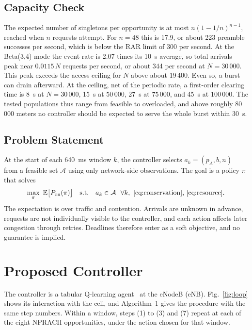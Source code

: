 \documentclass[conference]{IEEEtran}
\begin{document}
\subsection{Capacity Check}
The expected number of singletons per opportunity is at most $n(1-1/n)^{n-1}$, reached
when $n$ requests attempt. For $n = 48$ this is 17.9, or about 223 preamble successes
per second, which is below the RAR limit of 300 per second. At the Beta(3,4) mode the
event rate is 2.07 times its 10~s average, so total arrivals peak near $0.0115\,N$
requests per second, or about 344 per second at $N = 30\,000$. This peak exceeds the
access ceiling for $N$ above about 19\,400. Even so, a burst can drain afterward. At
the ceiling, net of the periodic rate, a first-order clearing time is 8~s at
$N = 30\,000$, 15~s at $50\,000$, 27~s at $75\,000$, and 45~s at $100\,000$. The tested
populations thus range from feasible to overloaded, and above roughly 80\,000 meters
no controller should be expected to serve the whole burst within 30~s.

\subsection{Problem Statement}
At the start of each 640~ms window $k$, the controller selects
$a_k = (p_A, b, n)$ from a feasible set $\mathcal{A}$ using only network-side
observations. The goal is a policy $\pi$ that solves
\begin{equation}
\max_{\pi}\ \mathbb{E}\big[P_{\mathrm{on}}(\pi)\big]
\quad \text{s.t.} \quad a_k \in \mathcal{A}\ \ \forall k,
\ \text{\eqref{eq:conservation}, \eqref{eq:resource}.}
\label{eq:problem}
\end{equation}
The expectation is over traffic and contention. Arrivals are unknown in advance,
requests are not individually visible to the controller, and each action affects
later congestion through retries. Deadlines therefore enter as a soft objective,
and no guarantee is implied.

\section{Proposed Controller}
\label{sec:controller}
The controller is a tabular Q-learning agent~\cite{watkins} at the eNodeB (eNB).
Fig.~\ref{fig:loop} shows its interaction with the cell, and Algorithm~1 gives the
procedure with the same step numbers. Within a window, steps (1) to (3) and (7) repeat
at each of the eight NPRACH opportunities, under the action chosen for that window.
\end{document}
